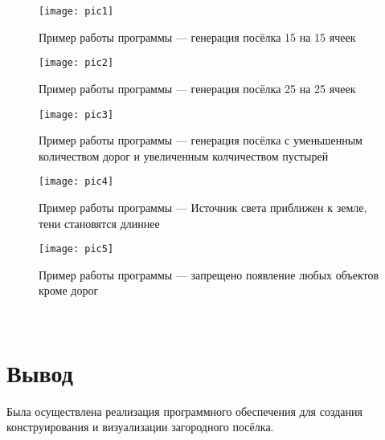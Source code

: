 \begin{figure}[h!]
  \texttt{[image: pic1]}
  \caption{Пример работы программы --- генерация посёлка 15 на 15 ячеек}
  \label{fig:example_1}
\end{figure}
\begin{figure}[h!]
  \texttt{[image: pic2]}
  \caption{Пример работы программы ---  генерация посёлка 25 на 25 ячеек}
  \label{fig:example_2}
\end{figure}
\begin{figure}[h!]
  \texttt{[image: pic3]}
  \caption{Пример работы программы --- генерация посёлка с уменьшенным количеством дорог и увеличенным колчичеством пустырей}
  \label{fig:example_3}
\end{figure}
\begin{figure}[h!]
  \texttt{[image: pic4]}
  \caption{Пример работы программы --- Источник света приближен к земле, тени становятся длиннее}
  \label{fig:example_4}
\end{figure}
\begin{figure}[h!]
  \texttt{[image: pic5]}
  \caption{Пример работы программы --- запрещено появление любых объектов кроме дорог}
  \label{fig:example_5}
\end{figure}

\newpage

\

\section{Вывод}

Была осуществлена реализация программного обеспечения для создания конструирования и визуализации загородного посёлка.